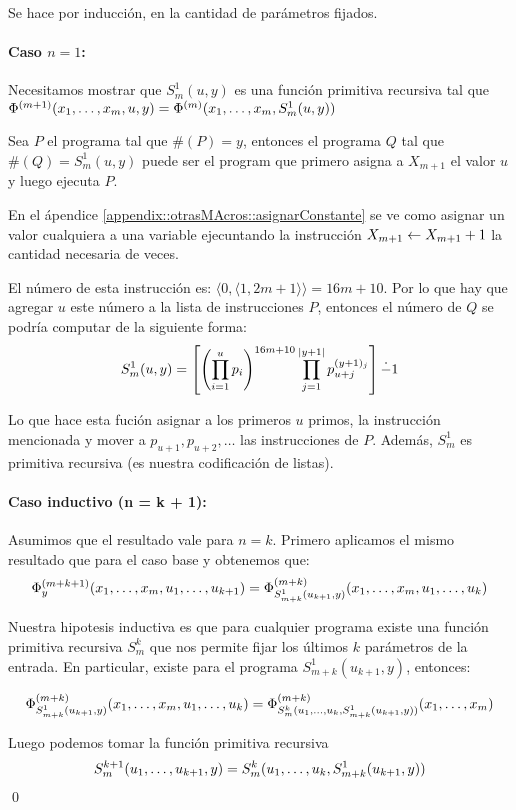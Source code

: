 \begin{demo}
	Se hace por inducción, en la cantidad de parámetros fijados.
	
	\paragraph{Caso $n = 1$:} Necesitamos mostrar que $S_m^1(u,y)$ es una función primitiva recursiva tal que $\Phi^{(m+1)}(x_1,\dots, x_{m},u,y) = \Phi^{(m)}(x_1,\dots, x_{m},S_m^1(u,y))$
	
	Sea $P$ el programa tal que $\#(P) = y$, entonces el programa $Q$ tal que $\#(Q) = S_m^1(u,y)$ puede ser el program que primero asigna a $X_{m+1}$ el valor $u$ y luego ejecuta $P$.
	
	En el ápendice \ref{appendix::otrasMAcros::asignarConstante} se ve como asignar un valor cualquiera a una variable ejecuntando la instrucción $X_{m+1} \leftarrow X_{m+1} + 1$ la cantidad necesaria de veces.
	
	El número de esta instrucción es: $\langle 0,\langle 1, 2m+1\rangle\rangle = 16m + 10$. Por lo que hay que agregar $u$ este número a la lista de instrucciones $P$, entonces el número de $Q$ se podría computar de la siguiente forma:
	$$S_m^1(u,y) = \left[
	\left(\prod_{i=1}^{u}p_i\right)^{16m+10} \prod_{j=1}^{|y+1|}p_{u+j}^{(y+1)_j}\right] \dot{-} 1$$
		\end{demo}
\begin{demoPart}
	Lo que hace esta fución asignar a los primeros $u$ primos, la instrucción mencionada y mover a $p_{u+1},p_{u+2},\dots$ las instrucciones de $P$. Además, $S_m^1$ es primitiva recursiva (es nuestra codificación de listas).

	\paragraph{Caso inductivo (n = k  + 1):} Asumimos que el resultado vale para $n = k$. Primero aplicamos el mismo resultado que para el caso base y obtenemos que:
	$$\Phi_y^{(m + k + 1)}(x_1,\dots, x_{m},u_1,\dots, u_{k+1}) = \Phi_{S_{m+k}^1(u_{k+1},y)}^{(m + k)}(x_1,\dots, x_{m},u_1,\dots, u_{k})$$
	
	Nuestra hipotesis inductiva es que para cualquier programa existe una función primitiva recursiva $S_m^k$ que nos permite fijar los últimos $k$ parámetros de la entrada. En particular, existe para  el programa $S_{m+k}^1(u_{k+1}, y)$, entonces:
	
	$$\Phi_{S_{m+k}^1(u_{k+1},y)}^{(m + k)}(x_1,\dots, x_{m},u_1,\dots, u_{k}) = \Phi_{S_{m}^k(u_1,\dots, u_{k},S_{m+k}^1(u_{k+1},y))}^{(m + k)}(x_1,\dots, x_{m}) $$
	
	Luego podemos tomar la función primitiva recursiva $$S_m^{k+1}(u_1,\dots, u_{k+1}, y) = S_{m}^k(u_1,\dots, u_{k},S_{m+k}^1(u_{k+1},y))$$ \qed
\end{demoPart}

